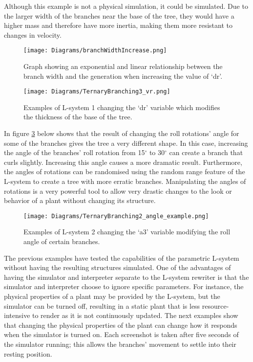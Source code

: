 Although this example is not a physical simulation, it could be simulated. Due to the larger width of the branches near the base of the tree, they would have a higher mass and therefore have more inertia, making them more resistant to changes in velocity.

\begin{figure}[htbp]
	{\centering
		\vspace{7px}
		\texttt{[image: Diagrams/branchWidthIncrease.png]}
		\caption{Graph showing an exponential and linear relationship between the branch width and the generation when increasing the value of `dr'.} \label{graph thickness}
	}
\end{figure}
\FloatBarrier

\begin{figure}[htbp]
	{\centering
		\vspace{7px}
		\texttt{[image: Diagrams/TernaryBranching3\_vr.png]} 
		\caption{Examples of L-system 1 changing the `dr' variable which modifies the thickness of the base of the tree.} \label{example thickness}
	}
\end{figure}
\FloatBarrier

\noindent
In figure \ref{example angle} below shows that the result of changing the roll rotations' angle for some of the branches gives the tree a very different shape. In this case, increasing the angle of the branches' roll rotation from 15$^\circ$ to 30$^\circ$ can create a branch that curls slightly. Increasing this angle causes a more dramatic result. Furthermore, the angles of rotations can be randomised using the random range feature of the L-system to create a tree with more erratic branches. Manipulating the angles of rotations is a very powerful tool to allow very drastic changes to the look or behavior of a plant without changing its structure. 

\begin{figure}[htbp]
	{\centering
		\vspace{7px}
		\texttt{[image: Diagrams/TernaryBranching2\_angle\_example.png]}
		\caption{Examples of L-system 2 changing the `a3' variable modifying the roll angle of certain branches.} \label{example angle}
	}
\end{figure}
\FloatBarrier

The previous examples have tested the capabilities of the parametric L-system without having the resulting structures simulated. One of the advantages of having the simulator and interpreter separate to the L-system rewriter is that the simulator and interpreter choose to ignore specific parameters. For instance, the physical properties of a plant may be provided by the L-system, but the simulator can be turned off, resulting in a static plant that is less resource-intensive to render as it is not continuously updated. The next examples show that changing the physical properties of the plant can change how it responds when the simulator is turned on. Each screenshot is taken after five seconds of the simulator running; this allows the branches' movement to settle into their resting position.

